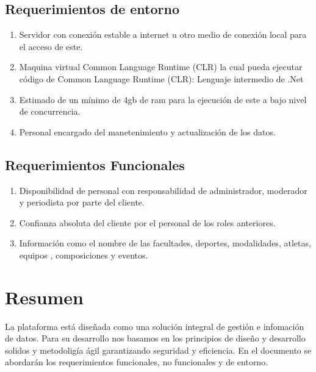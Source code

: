 \documentclass{article} %
\begin{document}
\subsection{Requerimientos de entorno }
 \begin{enumerate}
     \item Servidor con conexión estable a internet u otro medio de conexión local para el acceso de este.
     \item Maquina virtual Common Language Runtime (CLR) la cual pueda ejecutar código de Common Language Runtime (CLR): Lenguaje intermedio de .Net
     \item Estimado de un mínimo de 4gb de ram para la ejecución de este a bajo nivel de concurrencia.
     \item Personal encargado del manetenimiento y actualización de los datos.
 \end{enumerate}
\subsection{Requerimientos Funcionales}
\begin{enumerate}
    \item Disponibilidad de personal con responsabilidad de administrador, moderador y periodista por parte del cliente.
    \item Confianza absoluta del cliente por el personal de los roles anteriores.
    \item Información como el nombre de las facultades, deportes, modalidades, atletas, equipos , composiciones y eventos.
    
\end{enumerate}
 \section{Resumen}
 La plataforma está diseñada como una solución integral de gestión e infomación de datos. Para su desarrollo nos basamos en los principios de diseño y desarrollo solidos y metodoligía ágil garantizando seguridad y eficiencia.
 En el documento se abordarán los requerimientos funcionales, no funcionales y de entorno.
 
\end{document}
